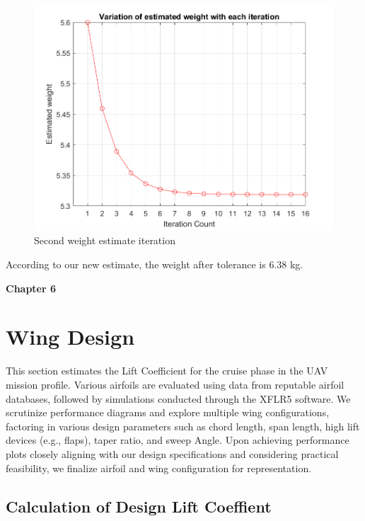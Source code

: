 \documentclass[12 pt]{article}
\begin{document}
\begin{figure}[h]
    \centering
    \includegraphics[width=1.0\linewidth]{Codes//Week 2/weight_2.png}
    \caption{Second weight estimate iteration}
    \label{Second weight estimate iteration}
\end{figure}

According to our new estimate, the weight after tolerance is 6.38 kg.

\afterpage{\clearpage}
\newpage

\textbf{\Huge{Chapter 6}}
\section{Wing Design}
This section estimates the Lift Coefficient for the cruise phase in the UAV mission profile. Various airfoils are evaluated using data from reputable airfoil databases, followed by simulations conducted through the XFLR5 software. We scrutinize performance diagrams and explore multiple wing configurations, factoring in various design parameters such as chord length, span length, high lift devices (e.g., flaps), taper ratio, and sweep Angle. Upon achieving performance plots closely aligning with our design specifications and considering practical feasibility, we finalize airfoil and wing configuration for representation.
\vspace{5mm} 
 

\color{red}
\subsection{\large Calculation of Design Lift Coeffient}
\end{document}
